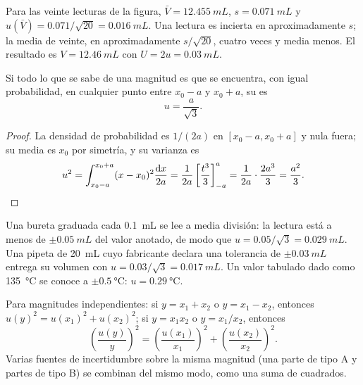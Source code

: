 \begin{example}
Para las veinte lecturas de la figura, $\bar V = \qty{12.455}{mL}$,
$s = \qty{0.071}{mL}$ y $u(\bar V) = 0.071/\sqrt{20} = \qty{0.016}{mL}$.
Una lectura es incierta en aproximadamente $s$; la media de veinte, en
aproximadamente $s/\sqrt{20}$, cuatro veces y media menos. El resultado es
$V = \qty{12.46}{mL}$ con $U = 2u = \qty{0.03}{mL}$.
\end{example}

\begin{proposition}\label{prop:b1:lab-techniques-1:type-b}
Si todo lo que se sabe de una magnitud es que se encuentra, con igual
probabilidad, en cualquier punto entre $x_0 - a$ y $x_0 + a$, su
 es
\[
  u = \frac{a}{\sqrt3}.
\]
\end{proposition}
\begin{proof}
La densidad de probabilidad es $1/(2a)$ en $[x_0 - a, x_0 + a]$ y nula
fuera; su media es $x_0$ por simetría, y su varianza es
\[
  u^2 = \int_{x_0-a}^{x_0+a} (x - x_0)^2 \frac{\mathrm{d}x}{2a}
      = \frac{1}{2a} \left[\frac{t^3}{3}\right]_{-a}^{a}
      = \frac{1}{2a}\cdot\frac{2a^3}{3} = \frac{a^2}{3}. \qedhere
\]
\end{proof}

\begin{example}
Una bureta graduada cada \qty{0.1}{mL} se lee a media división: la
lectura está a menos de $\pm\qty{0.05}{mL}$ del valor anotado, de modo
que $u = 0.05/\sqrt3 = \qty{0.029}{mL}$. Una pipeta de \qty{20}{mL} cuyo
fabricante declara una tolerancia de $\pm\qty{0.03}{mL}$ entrega su
volumen con $u = 0.03/\sqrt3 = \qty{0.017}{mL}$. Un valor tabulado dado
como \qty{135}{\celsius} se conoce a $\pm\qty{0.5}{\celsius}$:
$u = \qty{0.29}{\celsius}$.
\end{example}

\begin{proposition}\label{prop:b1:lab-techniques-1:combine}
Para magnitudes independientes: si $y = x_1 + x_2$ o $y = x_1 - x_2$,
entonces $u(y)^2 = u(x_1)^2 + u(x_2)^2$; si $y = x_1 x_2$ o
$y = x_1/x_2$, entonces
\[
  \left(\frac{u(y)}{y}\right)^2 = \left(\frac{u(x_1)}{x_1}\right)^2
  + \left(\frac{u(x_2)}{x_2}\right)^2 .
\]
Varias fuentes de incertidumbre sobre la misma magnitud (una parte de
tipo A y partes de tipo B) se combinan del mismo modo, como una suma de
cuadrados.
\end{proposition}
\admitted

